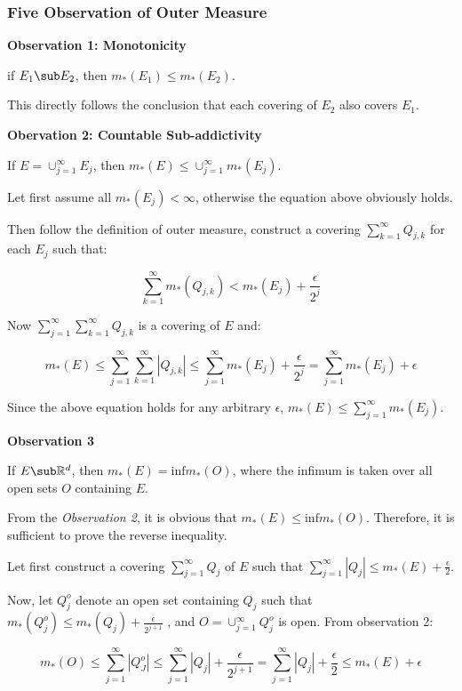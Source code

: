 \documentclass[
]{article}
\date{}
\begin{document}
\hypertarget{header-n0}{%
\subsubsection{Five Observation of Outer Measure}\label{header-n0}}

\textbf{Observation 1: Monotonicity}

if \(E_1 \sub E_2\), then \(m_{*}(E_1)\leq m_{*}(E_2)\).

This directly follows the conclusion that each covering of \(E_2\) also
covers \(E_1\).

\textbf{Obervation 2: Countable Sub-addictivity}

If \(E = \cup_{j=1}^{\infty}E_j\), then
\(m_{*}(E)\leq\cup_{j=1}^{\infty}m_{*}(E_j)\).

Let first assume all \(m_*(E_j)<\infty\), otherwise the equation above
obviously holds.

Then follow the definition of outer measure, construct a covering
\(\sum_{k=1}^{\infty}Q_{j,k}\) for each \(E_j\) such that:

\[\sum_{k=1}^{\infty}m_{*}(Q_{j,k}) < m_{*}(E_j) + \frac{\epsilon}{2^j}\]

Now \(\sum_{j=1}^{\infty}\sum_{k=1}^{\infty}Q_{j, k}\) is a covering of
\(E\) and:

\[m_{*}(E)\leq \sum_{j=1}^{\infty}\sum_{k=1}^{\infty}|Q_{j, k}|\leq\sum_{j=1}^{\infty}m_*(E_j)+\frac{\epsilon}{2^j}=\sum_{j=1}^{\infty}m_*(E_j)+\epsilon\]

Since the above equation holds for any arbitrary \(\epsilon\),
\(m_*(E)\leq\sum_{j=1}^{\infty}m_*(E_j)\).

\textbf{Observation 3}

If \(E\sub \mathbb{R}^d\), then \(m_*(E)=\mathrm{inf}m_*(O)\), where the
infimum is taken over all open sets \(O\) containing \(E\).

From the \emph{Observation 2}, it is obvious that
\(m_*(E)\leq \mathrm{inf}m_*(O)\). Therefore, it is sufficient to prove
the reverse inequality.

Let first construct a covering \(\sum_{j=1}^{\infty}Q_j\) of \(E\) such
that \(\sum_{j=1}^{\infty}|Q_j|\leq m_*(E)+\frac{\epsilon}{2}\).

Now, let \(Q_{j}^o\) denote an open set containing \(Q_j\) such that
\(m_*(Q_j^o)\leq m_*(Q_j)+\frac{\epsilon}{2^{j+1}} \) , and
\(O=\cup_{j=1}^{\infty}Q_{j}^o\) is open. From observation 2:

\[m_*(O)\leq \sum_{j=1}^{\infty}|Q_J^o|\leq\sum_{j=1}^{\infty}|Q_j|+\frac{\epsilon}{2^{{j+1}}}=\sum_{j=1}^{\infty}|Q_j|+\frac{\epsilon}{2}\leq m_*(E)+\epsilon\]
\end{document}
